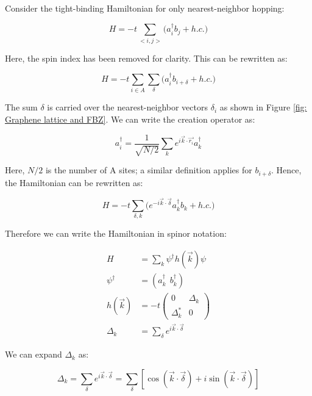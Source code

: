 \documentclass[]{article}
\begin{document}
Consider the tight-binding Hamiltonian for only nearest-neighbor hopping:

\begin{equation}
	H = -t \sum_{<i,j>} \bigg( a_{i}^\dagger b_{j} + h.c. \bigg) 
\end{equation}

Here, the spin index has been removed for clarity. This can be rewritten as:

\begin{equation}
	H = -t \sum_{i\in A} \sum_{\delta} \bigg( a_{i}^\dagger b_{i+\delta} + h.c. \bigg) 
\end{equation}

The sum $\delta$ is carried over the nearest-neighbor vectors $\delta_i$ as shown in Figure \ref{fig: Graphene lattice and FBZ}. We can write the creation operator as:

\begin{equation}
	a_{i}^\dagger = \frac{1}{\sqrt{N/2}} \sum_k e^{i\vec{k}\cdot \vec{r_i}} a_{k}^\dagger
\end{equation}

Here, $N/2$ is the number of A sites; a similar definition applies for $b_{i+\delta}$. Hence, the Hamiltonian can be rewritten as:

\begin{equation}
	H = -t \sum_{\delta, k} \bigg( e^{-i\vec{k}\cdot \vec{\delta}}a_{k}^\dagger b_{k} + h.c. \bigg) 
\end{equation}

Therefore we can write the Hamiltonian in spinor notation:

\begin{align}
	H &= \sum_k \psi^{\dagger}h(\vec{k})\psi \\
	\psi^{\dagger} &= (a_k^{\dagger} \ \ b_k^{\dagger})\\
	h(\vec{k}) &= -t \begin{pmatrix}
				0 & \Delta_k\\
				\Delta_k^{*} & 0
				\end{pmatrix} \\
	\Delta_k &= \sum_{\delta} e^{i\vec{k}\cdot \vec{\delta}}
\end{align}

We can expand $\Delta_k$ as:

\begin{equation}
		\Delta_k = \sum_{\delta} e^{i\vec{k}\cdot \vec{\delta}} = \sum_{\delta} [\cos(\vec{k}\cdot \vec{\delta}) + i\sin(\vec{k}\cdot \vec{\delta})]
\end{equation}
\end{document}
